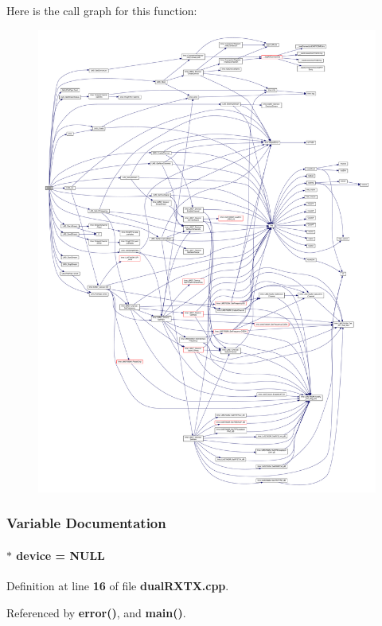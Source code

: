 Here is the call graph for this function\+:
\nopagebreak
\begin{figure}[H]
\begin{center}
\leavevmode
\includegraphics[width=350pt]{da/d1f/dualRXTX_8cpp_a3c04138a5bfe5d72780bb7e82a18e627_cgraph}
\end{center}
\end{figure}




\subsubsection{Variable Documentation}
\paragraph[{device}]{$\ast$ device = N\+U\+LL}\label{dualRXTX_8cpp_a6bc15a746822d9c4a5621463acd4ca25}


Definition at line {\bf 16} of file {\bf dual\+R\+X\+T\+X.\+cpp}.



Referenced by {\bf error()}, and {\bf main()}.

